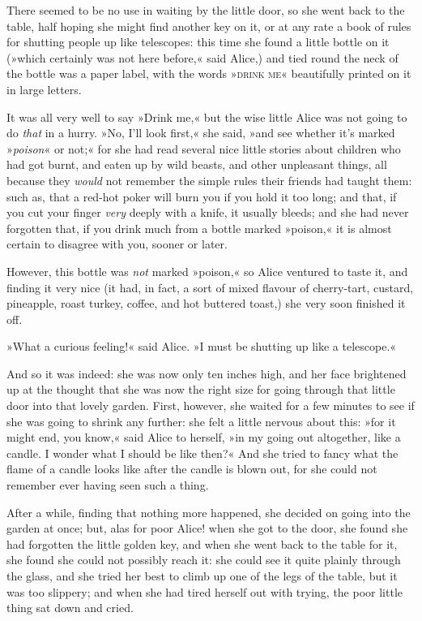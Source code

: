 There seemed to be no use in waiting by the little door, so she went back to the table, half hoping she might find another key on it, or at any rate a book of rules for shutting people up like telescopes: this time she found a little bottle on it (»which certainly was not here before,« said Alice,) and tied round the neck of the bottle was a paper label, with the words »\textsc{drink me}« beautifully printed on it in large letters.

It was all very well to say »Drink me,« but the wise little Alice was not going to do \textit{that} in a hurry. »No, I'll look first,« she said, »and see whether it's marked »\textit{poison}« or not;« for she had read several nice little stories about children who had got burnt, and eaten up by wild beasts, and other unpleasant things, all because they \textit{would} not remember the simple rules their friends had taught them: such as, that a red-hot poker will burn you if you hold it too long; and that, if you cut your finger \textit{very} deeply with a knife, it usually bleeds; and she had never forgotten that, if you drink much from a bottle marked »poison,« it is almost certain to disagree with you, sooner or later.

However, this bottle was \textit{not} marked »poison,« so Alice ventured to taste it, and finding it very nice (it had, in fact, a sort of mixed flavour of cherry-tart, custard, pineapple, roast turkey, coffee, and hot buttered toast,) she very soon finished it off.

\divider

»What a curious feeling!« said Alice. »I must be shutting up like a telescope.«

And so it was indeed: she was now only ten inches high, and her face brightened up at the thought that she was now the right size for going through that little door into that lovely garden. First, however, she waited for a few minutes to see if she was going to shrink any further: she felt a little nervous about this: »for it might end, you know,« said Alice to herself, »in my going out altogether, like a candle. I wonder what I should be like then?« And she tried to fancy what the flame of a candle looks like after the candle is blown out, for she could not remember ever having seen such a thing.

After a while, finding that nothing more happened, she decided on going into the garden at once; but, alas for poor Alice! when she got to the door, she found she had forgotten the little golden key, and when she went back to the table for it, she found she could not possibly reach it: she could see it quite plainly through the glass, and she tried her best to climb up one of the legs of the table, but it was too slippery; and when she had tired herself out with trying, the poor little thing sat down and cried.

